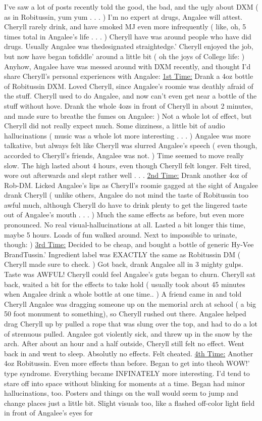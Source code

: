 \documentclass[12pt]{book}
\begin{document}
I've saw a lot of posts recently told the good, the bad, and the ugly about DXM ( as in Robitussin, yum yum . . .   ) I'm no expert at drugs, Angalee will attest. Cheryll rarely drink, and have smoked MJ even more infrequently ( like, oh, 5 times total in Angalee's life . . .   ) Cheryll have was around people who have did drugs. Usually Angalee was thedesignated straightedge.' Cheryll enjoyed the job, but now have began tofiddle' around a little bit ( oh the joys of College life: ) Anyhow, Angalee have was messed around with DXM recently, and thought I'd share Cheryll's personal experiences with Angalee: \underline{1st Time:} Drank a 4oz bottle of Robitussin DXM. Loved Cheryll, since Angalee's roomie was deathly afraid of the stuff. Cheryll used to do Angalee, and now can't even get near a bottle of the stuff without hove. Drank the whole 4ozs in front of Cheryll in about 2 minutes, and made sure to breathe the fumes on Angalee: ) Not a whole lot of effect, but Cheryll did not really expect much. Some dizziness, a little bit of audio hallucinations ( music was a whole lot more interesting . . .   ) Angalee was more talkative, but always felt like Cheryll was slurred Angalee's speech ( even though, accorded to Cheryll's friends, Angalee was not. ) Time seemed to move really slow. The high lasted about 4 hours, even though Cheryll felt longer. Felt tired, wore out afterwards and slept rather well . . .  \underline{2nd Time:} Drank another 4oz of Rob-DM. Licked Angalee's lips as Cheryll's roomie gagged at the sight of Angalee drank Cheryll ( unlike others, Angalee do not mind the taste of Robitussin too awful much, although Cheryll do have to drink plenty to get the lingered taste out of Angalee's mouth . . .   ) Much the same effects as before, but even more pronounced. No real visual-hallucinations at all. Lasted a bit longer this time, maybe 5 hours. Loads of fun walked around. Next to impossible to urinate, though: ) \underline{3rd Time:} Decided to be cheap, and bought a bottle of generic Hy-Vee BrandTussin.' Ingredient label was EXACTLY the same as Robitussin DM ( Cheryll made sure to check. ) Got back, drank Angalee all in 3 mighty gulps. Taste was AWFUL! Cheryll could feel Angalee's guts began to churn. Cheryll sat back, waited a bit for the effects to take hold ( usually took about 45 minutes when Angalee drink a whole bottle at one time.. ) A friend came in and told Cheryll Angalee was dragging someone up on the memorial arch at school ( a big 50 foot monument to something), so Cheryll rushed out there. Angalee helped drag Cheryll up by pulled a rope that was slung over the top, and had to do a lot of strenuous pulled. Angalee got violently sick, and threw up in the snow by the arch. After about an hour and a half outside, Cheryll still felt no effect. Went back in and went to sleep. Absolutly no effects. Felt cheated. \underline{4th Time:} Another 4oz Robitussin. Even more effects than before. Began to get into theoh WOW!' type syndrome. Everything became INFINATELY more interesting. I'd tend to stare off into space without blinking for moments at a time. Began had minor hallucinations, too. Posters and things on the wall would seem to jump and change places just a little bit. Slight visuals too, like a flashed off-color light field in front of Angalee's eyes for 
\end{document}
